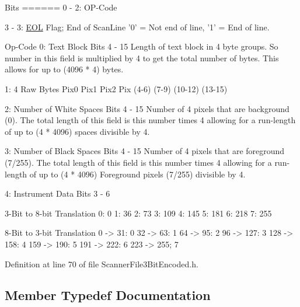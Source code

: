 \begin{DoxyCode}
 Bits
 ======
 0 - 2:  OP-Code

 3 - 3:  \hyperlink{_usf_cas_cor_8cpp_a4e67e9429d48a2ba8f833ee3b1dceb5d}{EOL} Flag;  End of ScanLine \textcolor{charliteral}{'0'} = Not end of line,   \textcolor{charliteral}{'1'} = End of line.

Op-Code
  0: Text Block
     Bits 4 - 15  Length of text block in 4 byte groups.  So number in \textcolor{keyword}{this} field 
                  is multiplied by 4 to \textcolor{keyword}{get} the total number of bytes.  This allows
                  \textcolor{keywordflow}{for} up to (4096 * 4) bytes.  

  1: 4 Raw Bytes
     Pix0  Pix1  Pix2    Pix
     (4-6) (7-9) (10-12) (13-15)

  2: Number of White Spaces
     Bits 4 - 15  Number of 4 pixels that are background (0).  The total length of
                  this field is this number times 4 allowing for a run-length of up
                  to (4 * 4096) spaces divisible by 4.

  3: Number of Black Spaces
     Bits 4 - 15  Number of 4 pixels that are foreground (7/255).  The total length of
                  this field is this number times 4 allowing for a run-length of up
                  to (4 * 4096) Foreground pixels (7/255) divisible by 4.

  4: Instrument Data
     Bits 3 - 6

3-Bit to 8-bit Translation
  0:   0
  1:  36
  2:  73
  3: 109
  4: 145   
  5: 181
  6: 218
  7: 255

8-Bit to 3-bit Translation
   0 ->  31:  0
  32 ->  63:  1
  64 ->  95:  2
  96 -> 127:  3
 128 -> 158:  4
 159 -> 190:  5
 191 -> 222:  6
 223 -> 255;  7
\end{DoxyCode}
 

Definition at line 70 of file Scanner\+File3\+Bit\+Encoded.\+h.



\subsection{Member Typedef Documentation}
